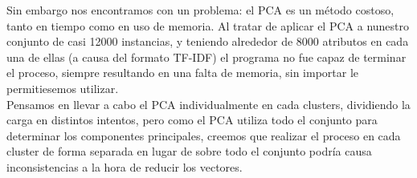 \documentclass[10pt,a4paper,draft]{article}
\begin{document}
Sin embargo nos encontramos con un problema: el PCA es un método costoso, tanto en tiempo como en uso de memoria. Al tratar de aplicar el PCA a nunestro conjunto de casi 12000 instancias, y teniendo alrededor de 8000 atributos en cada una de ellas (a causa del formato TF-IDF) el programa no fue capaz de terminar el proceso, siempre resultando en una falta de memoria, sin importar le permitiesemos utilizar.\\

Pensamos en llevar a cabo el PCA individualmente en cada clusters, dividiendo la carga en distintos intentos, pero como el PCA utiliza todo el conjunto para determinar los componentes principales, creemos que realizar el proceso en cada cluster de forma separada en lugar de sobre todo el conjunto podría causa inconsistencias a la hora de reducir los vectores.

\end{document}
